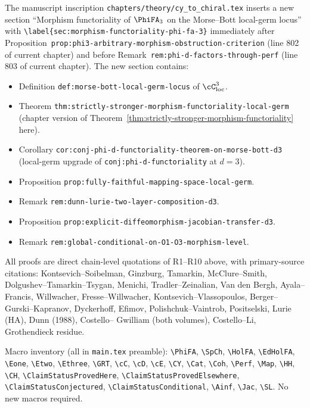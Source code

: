 The manuscript inscription
\texttt{chapters/theory/cy\_to\_chiral.tex} inserts a new section
``Morphism functoriality of $\PhiFA_3$ on the Morse--Bott local-germ
locus'' with \texttt{\textbackslash label\{sec:morphism-functoriality-phi-fa-3\}}
immediately after Proposition~\texttt{prop:phi3-arbitrary-morphism-obstruction-criterion}
(line 802 of current chapter) and before
Remark~\texttt{rem:phi-d-factors-through-perf} (line 803 of current
chapter).  The new section contains:
\begin{itemize}
 \item Definition \texttt{def:morse-bott-local-germ-locus} of
       $\cC_{\mathrm{loc}}^3$.
 \item Theorem
       \texttt{thm:strictly-stronger-morphism-functoriality-local-germ}
       (chapter version of
       Theorem~\ref{thm:strictly-stronger-morphism-functoriality} here).
 \item Corollary
       \texttt{cor:conj-phi-d-functoriality-theorem-on-morse-bott-d3}
       (local-germ upgrade of
       \texttt{conj:phi-d-functoriality} at $d = 3$).
 \item Proposition
       \texttt{prop:fully-faithful-mapping-space-local-germ}.
 \item Remark \texttt{rem:dunn-lurie-two-layer-composition-d3}.
 \item Proposition
       \texttt{prop:explicit-diffeomorphism-jacobian-transfer-d3}.
 \item Remark \texttt{rem:global-conditional-on-O1-O3-morphism-level}.
\end{itemize}

All proofs are direct chain-level quotations of R1--R10 above, with
primary-source citations: Kontsevich--Soibelman, Ginzburg, Tamarkin,
McClure--Smith, Dolgushev--Tamarkin--Tsygan, Menichi, Tradler--Zeinalian,
Van den Bergh, Ayala--Francis, Willwacher, Fresse--Willwacher,
Kontsevich--Vlassopoulos, Berger--Gurski--Kapranov, Dyckerhoff, Efimov,
Polishchuk--Vaintrob, Positselski, Lurie (HA), Dunn (1988), Costello--
Gwilliam (both volumes), Costello--Li, Grothendieck residue.

Macro inventory (all in \texttt{main.tex} preamble):
\texttt{\textbackslash PhiFA}, \texttt{\textbackslash SpCh},
\texttt{\textbackslash HolFA}, \texttt{\textbackslash EdHolFA},
\texttt{\textbackslash Eone}, \texttt{\textbackslash Etwo},
\texttt{\textbackslash Ethree}, \texttt{\textbackslash GRT},
\texttt{\textbackslash cC}, \texttt{\textbackslash cD},
\texttt{\textbackslash cE}, \texttt{\textbackslash CY},
\texttt{\textbackslash Cat}, \texttt{\textbackslash Coh},
\texttt{\textbackslash Perf}, \texttt{\textbackslash Map},
\texttt{\textbackslash HH}, \texttt{\textbackslash CH},
\texttt{\textbackslash ClaimStatusProvedHere},
\texttt{\textbackslash ClaimStatusProvedElsewhere},
\texttt{\textbackslash ClaimStatusConjectured},
\texttt{\textbackslash ClaimStatusConditional},
\texttt{\textbackslash Ainf}, \texttt{\textbackslash Jac},
\texttt{\textbackslash SL}.  No new macros required.

